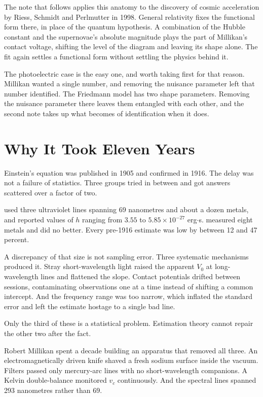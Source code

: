 \documentclass[11pt]{article}
\begin{document}
The note that follows applies this anatomy to the discovery of cosmic
acceleration by Riess, Schmidt and Perlmutter in 1998.  General relativity
fixes the functional form there, in place of the quantum hypothesis.  A
combination of the Hubble constant and the supernovae's absolute magnitude
plays the part of Millikan's contact voltage, shifting the level of the
diagram and leaving its shape alone.  The fit again settles a functional form
without settling the physics behind it.

The photoelectric case is the easy one, and worth taking first for that
reason.  Millikan wanted a single number, and removing the nuisance parameter
left that number identified.  The Friedmann model has two shape parameters.  Removing the nuisance
parameter there leaves them entangled with each other, and the second note
takes up what becomes of identification when it does.

\section{Why It Took Eleven Years}

Einstein's equation was published in 1905 and confirmed in 1916.  The delay
was not a failure of statistics.  Three groups tried in between and got
answers scattered over a factor of two.

\citet{Hughes1913} used three ultraviolet lines spanning 69 nanometres and
about a dozen metals, and reported values of $h$ ranging from
$3.55$ to $5.85 \times 10^{-27}$ erg$\cdot$s.  \citet{RichardsonCompton1912}
measured eight metals and did no better.  Every pre-1916 estimate was low by
between 12 and 47 percent.

A discrepancy of that size is not sampling error.  Three systematic
mechanisms produced it.  Stray short-wavelength light raised the apparent
$V_0$ at long-wavelength lines and flattened the slope.  Contact potentials
drifted between sessions, contaminating observations one at a time instead of
shifting a common intercept.  And the frequency range was too narrow, which
inflated the standard error and left the estimate hostage to a single bad
line.

Only the third of these is a statistical problem.  Estimation theory cannot
repair the other two after the fact.

Robert Millikan spent a decade building an apparatus that removed all three.
An electromagnetically driven knife shaved a fresh sodium surface inside the
vacuum.  Filters passed only mercury-arc lines with no short-wavelength
companions.  A Kelvin double-balance monitored $v_c$ continuously.  And the
spectral lines spanned 293 nanometres rather than 69.
\end{document}
